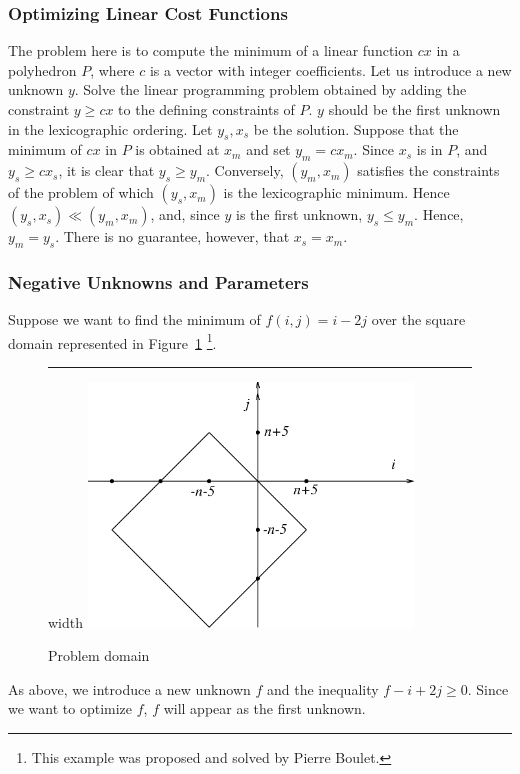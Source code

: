 \documentclass[12pt,a4paper]{article}
\begin{document}
\subsubsection{Optimizing Linear Cost Functions}

The problem here is to compute the minimum of a linear function $cx$
in a polyhedron $P$,
where $c$ is a vector with integer coefficients. Let us introduce
a new unknown $y$. Solve the linear programming problem obtained by
adding the constraint $y \ge cx$ to the defining constraints of $P$.
$y$ should be the first unknown in the lexicographic ordering. Let
$y_s, x_s$ be the solution. Suppose that the minimum of $cx$ in $P$
is obtained at $x_m$ and set $y_m = c x_m$. Since $x_s$ is in $P$,
and $y_s \ge cx_s$, it is clear that $y_s \ge y_m$. Conversely,
$(y_m, x_m)$ satisfies the constraints of the problem of which $(y_s, x_m)$
is the lexicographic minimum. Hence $(y_s, x_s) \ll (y_m, x_m)$, and,
since $y$ is the first unknown, $y_s \le y_m$. Hence, $y_m = y_s$.
There is no guarantee, however, that $x_s = x_m$.

%
%


\subsubsection{Negative Unknowns and Parameters}

Suppose we want to find the minimum of $f(i,j) = i-2j$ over the square
domain represented in Figure~\ref{iter-domain}%
\footnote{This example was proposed and solved by Pierre Boulet.}.

\begin{figure}[htb]
\hrule width \columnwidth
\centering\leavevmode
\includegraphics[height=6.5cm]{images/negatifs.eps}
\caption{\label{iter-domain} Problem domain}
\end{figure}
  
As above,
we introduce a new unknown $f$ and the inequality $f-i+2j \geq
0$. Since we want to optimize $f$, $f$ will appear
as the first unknown.
\end{document}
